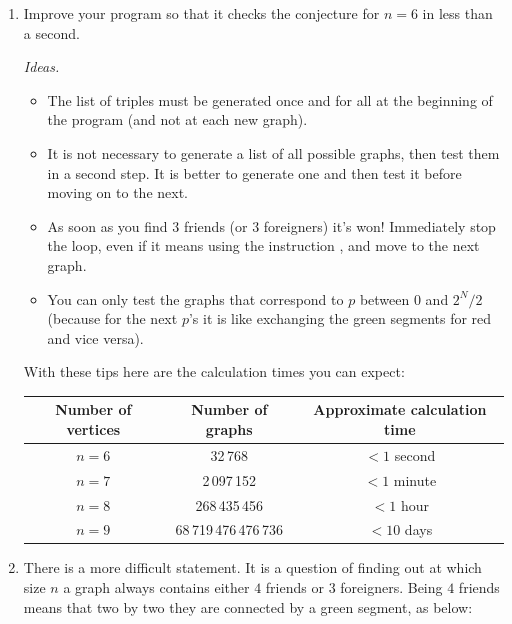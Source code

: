 \documentclass[11pt,class=report,crop=false]{standalone}
\begin{document}
\begin{activite}[To go further]


\begin{enumerate}
  \item Improve your program so that it checks the conjecture for $n=6$ in less than a second.
  
  
\emph{Ideas.}
  \begin{itemize}
    \item The list of triples must be generated once and for all at the beginning of the program (and not at each new graph).
    \item It is not necessary to generate a list of all possible graphs, then test them in a second step. It is better to generate one and then test it before moving on to the next.
    \item As soon as you find $3$ friends (or $3$ foreigners) it's won! Immediately stop the loop, even if it means using the instruction , and move to the next graph.
    \item You can only test the graphs that correspond to $p$ between $0$ and $2^{N}/2$ (because for the next $p$'s it is like exchanging the green segments for red and vice versa).
  \end{itemize}
  
\medskip
  
  With these tips here are the calculation times you can expect:
  \begin{center}
  \begin{tabular}{|c|c|c|}
  \hline
  Number of vertices & Number of graphs & Approximate calculation time \\
  \hline\hline
  $n=6$ & 32\,768 & $< 1$ second \\
  $n=7$ & 2\,097\,152 & $< 1$ minute \\  
  $n=8$ & 268\,435\,456 & $< 1$ hour \\
  $n=9$ & 68\,719\,476\,476\,736 & $< 10$ days \\ 
  \hline
  \end{tabular} 
  \end{center}




 
  \item There is a more difficult statement. It is a question of finding out at which size $n$ a graph always contains either $4$ friends or $3$ foreigners. 
  Being $4$ friends means that two by two they are connected by a green segment, as below:


\end{enumerate}
\end{activite}
\end{document}
